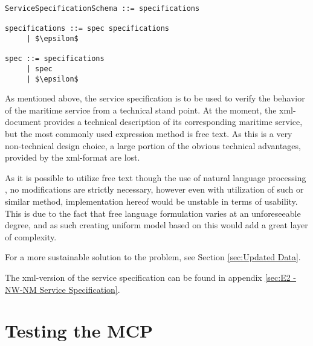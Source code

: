 \begin{lstlisting}[mathescape=true, keywordstyle={}, label={lst:sSpecReduced}, caption={Reduced parser grammar of Service Specification Schema},captionpos={below}]
ServiceSpecificationSchema ::= specifications

specifications ::= spec specifications
     | $\epsilon$
     
spec ::= specifications
     | spec
     | $\epsilon$
\end{lstlisting}

As mentioned above, the service specification is to be used to verify the behavior of the maritime service from a technical stand point. At the moment, the xml-document provides a technical description of its corresponding maritime service, but the most commonly used expression method is free text. As this is a very non-technical design choice, a large portion of the obvious technical advantages, provided by the xml-format are lost. 

As it is possible to utilize free text though the use of natural language processing \cite{nlp}, no modifications are strictly necessary, however even with utilization of such or similar method, implementation hereof would be unstable in terms of usability. This is due to the fact that free language formulation varies at an unforeseeable degree, and as such creating uniform model based on this would add a great layer of complexity.

For a more sustainable solution to the problem, see Section \ref{sec:Updated Data}.

The xml-version of the service specification can be found in appendix \ref{sec:E2 - NW-NM Service Specification}.

\section{Testing the MCP} %

